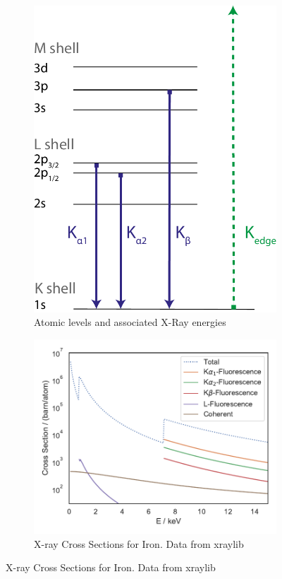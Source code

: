 \begin{figure}
	\centering
	\begin{subfigure}[b]{0.35\textwidth}
		\includegraphics[width=\linewidth]{images/levels.pdf}
		\caption[Atomic Levels]{Atomic levels and associated X\nobreakdash-Ray energies}
		\label{fig:levels}
	\end{subfigure}
	\begin{subfigure}[b]{0.45\textwidth}
		\includegraphics[width=\linewidth]{images/crosssectionFe.pdf}
		\caption[Cross Sections]{X-ray Cross Sections for Iron. Data from xraylib \cite{xraylib}}
		\label{fig:cross}
	\end{subfigure}
\end{figure}

